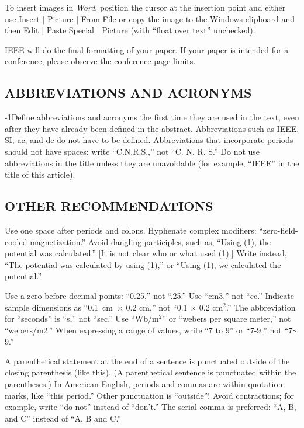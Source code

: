\documentclass{IEEEojcsys}
\begin{document}
To insert images in {\it Word}, position the cursor at the insertion point and either use Insert $|$ Picture $|$ From File or copy the image to the Windows clipboard and then Edit $|$ Paste Special $|$ Picture (with ``float over text'' unchecked). 

IEEE will do the final formatting of your paper. If your paper is intended for a conference, please observe the conference page limits.

\subsection{ABBREVIATIONS AND ACRONYMS}

\looseness-1Define abbreviations and acronyms the first time they are used in the text, even after they have already been defined in the abstract. Abbreviations such as IEEE, SI, ac, and dc do not have to be defined. Abbreviations that incorporate periods should not have spaces: write ``C.N.R.S.,'' not ``C. N. R. S.'' Do not use abbreviations in the title unless they are unavoidable (for example, ``IEEE'' in the title of this article).

\subsection{OTHER RECOMMENDATIONS}

Use one space after periods and colons. Hyphenate complex modifiers: ``zero-field-cooled magnetization.'' Avoid dangling participles, such as, ``Using (1), the potential was calculated.'' [It is not clear who or what used (1).] Write instead, ``The potential was calculated by using (1),'' or ``Using (1), we calculated the potential.''

Use a zero before decimal points: ``0.25,'' not ``.25.'' Use ``cm3,'' not ``cc.'' Indicate sample dimensions as ``0.1~cm~$\times$ 0.2 cm,'' not ``0.1 $\times$ 0.2 cm$^2$.'' The abbreviation for ``seconds'' is ``s,'' not ``sec.'' Use ``Wb/m$^2$'' or ``webers per square meter,'' not ``webers/m2.'' When expressing a range of values, write ``7 to 9'' or ``7-9,'' not ``7$\sim$9.''

A parenthetical statement at the end of a sentence is punctuated outside of the closing parenthesis (like this). (A parenthetical sentence is punctuated within the parentheses.) In American English, periods and commas are within quotation marks, like ``this period.'' Other punctuation is ``outside''$!$ Avoid contractions; for example, write ``do not'' instead of ``don't.'' The serial comma is preferred: ``A, B, and C'' instead of ``A, B and C.''
\end{document}
